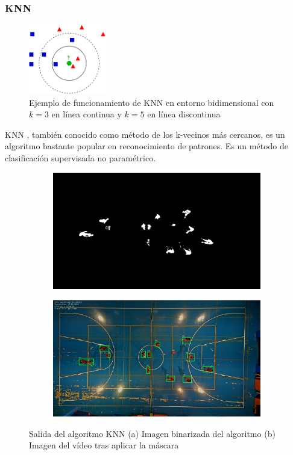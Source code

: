 \subsubsection*{KNN}
\begin{figure}[H]
    \centering
    \includegraphics[width=0.3\textwidth]{images/knnejemplo}
    \caption{Ejemplo de funcionamiento de KNN en entorno bidimensional con $k=3$ en línea continua y $k=5$ en línea discontinua}
    \label{fig:knnejemplo}
\end{figure}

KNN \cite{Bishop:2006:PRM:1162264}, también conocido como método de los k-vecinos más cercanos, es un algoritmo bastante popular en reconocimiento de patrones. Es un método de clasificación supervisada no paramétrico.

\begin{figure}
\begin{subfigure}{.5\textwidth}
  \centering
  \includegraphics[width=.9\linewidth]{images/KNNsub}
  \caption { }
  \label{fig:KNN1a}
\end{subfigure}%
\begin{subfigure}{.5\textwidth}
  \centering
  \includegraphics[width=.9\linewidth]{images/KNN}
  \caption { }
  \label{fig:KNN1b}
\end{subfigure}
\caption{Salida del algoritmo KNN (a) Imagen binarizada del algoritmo (b) Imagen del vídeo tras aplicar la máscara }
\label{fig:KNN}
\end{figure}

